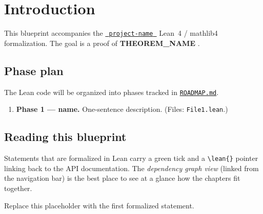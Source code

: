 \section{Introduction}
\label{sec:intro}

This blueprint accompanies the
\href{https://github.com/{{GITHUB_USER}}/{{project-name}}}{\texttt{ {{project-name}} }}
Lean~4 / mathlib4 formalization. The goal is a proof of \textbf{ {{THEOREM_NAME}} }.


\subsection*{Phase plan}

The Lean code will be organized into phases tracked in
\href{https://github.com/{{GITHUB_USER}}/{{project-name}}/blob/master/ROADMAP.md}{\texttt{ROADMAP.md}}.

\begin{enumerate}
  \item \textbf{Phase 1 --- name.} One-sentence description.
        (Files: \texttt{File1.lean}.)
\end{enumerate}

\subsection*{Reading this blueprint}

Statements that are formalized in Lean carry a green tick and a
\texttt{\textbackslash lean\{\}} pointer linking back to the API
documentation. The \emph{dependency graph view} (linked from the
navigation bar) is the best place to see at a glance how the chapters
fit together.

\begin{theorem}
  \label{thm:placeholder}
  \leanok
  Replace this placeholder with the first formalized statement.
\end{theorem}
